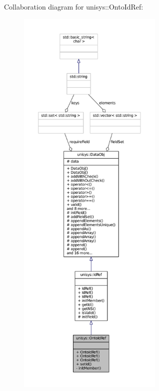 Collaboration diagram for unisys\-:\-:Onto\-Id\-Ref\-:
\nopagebreak
\begin{figure}[H]
\begin{center}
\leavevmode
\includegraphics[height=550pt]{classunisys_1_1OntoIdRef__coll__graph}
\end{center}
\end{figure}
